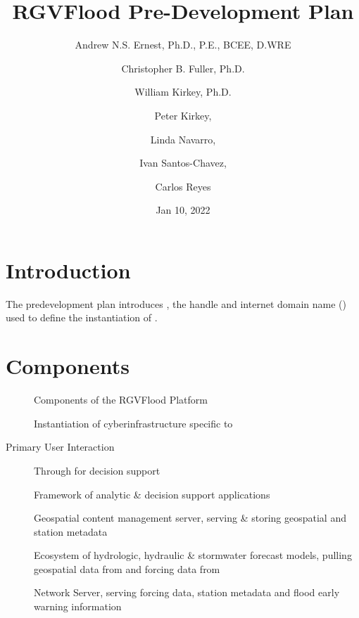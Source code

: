 \documentclass[letterpaper,10pt,english]{sphinxmanual}
\title{RGVFlood Pre-Development Plan}
\date{Jan 10, 2022}
\author{Andrew N.S. Ernest, Ph.D., P.E., BCEE, D.WRE \and Christopher B. Fuller, Ph.D. \and William Kirkey, Ph.D. \and Peter Kirkey, \and Linda Navarro, \and Ivan Santos-Chavez, \and Carlos Reyes}
\begin{document}
\pagestyle{empty}
\sphinxmaketitle
\pagestyle{plain}
\sphinxtableofcontents
\pagestyle{normal}
\label{\detokenize{predevelopment/index::doc}}



\chapter{Introduction}
\label{\detokenize{predevelopment/introduction:introduction}}\label{\detokenize{predevelopment/introduction::doc}}
\sphinxAtStartPar
The predevelopment plan introduces , the handle and internet domain name () used to define the  instantiation of .


\chapter{Components}
\label{\detokenize{predevelopment/components/index:components}}\label{\detokenize{predevelopment/components/index::doc}}
\begin{figure}[htbp]
\centering
\capstart

\noindent{}
\caption{Components of the RGVFlood Platform}\label{\detokenize{predevelopment/components/index:id1}}\end{figure}
\begin{description}
\item[{}] \leavevmode
\sphinxAtStartPar
Instantiation of  cyberinfrastructure specific to 

\item[{Primary User Interaction}] \leavevmode
\sphinxAtStartPar
Through  for decision support

\item[{}] \leavevmode
\sphinxAtStartPar
Framework of  analytic \& decision support applications

\item[{}] \leavevmode
\sphinxAtStartPar
Geospatial content management server, serving \& storing geospatial and  station metadata

\item[{}] \leavevmode
\sphinxAtStartPar
Ecosystem of hydrologic, hydraulic \& stormwater forecast models, pulling geospatial data from  and forcing data from 

\item[{}] \leavevmode
\sphinxAtStartPar
{} Network Server, serving forcing data, station metadata and flood early warning information

\end{description}
\end{document}
